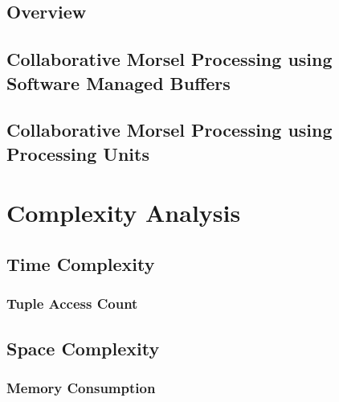 \subsection{Overview}
\subsection{Collaborative Morsel Processing using Software Managed Buffers}
\subsection{Collaborative Morsel Processing using Processing Units}

\section{Complexity Analysis}
\subsection{Time Complexity}
\subsubsection{Tuple Access Count}
\subsection{Space Complexity}
\subsubsection{Memory Consumption}
